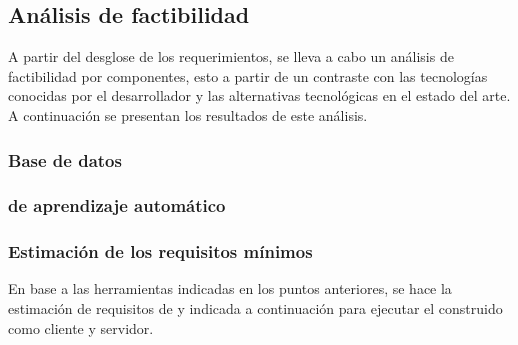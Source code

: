 \subsection{Análisis de factibilidad}
A partir del desglose de los requerimientos, se lleva a cabo un análisis de factibilidad por componentes, esto a partir de un contraste con las tecnologías conocidas por el desarrollador y las alternativas tecnológicas en el estado del arte. A continuación se presentan los resultados de este análisis.

\subsubsection*{}


\subsubsection*{}


\subsubsection*{Base de datos}

\subsubsection*{ de aprendizaje automático}


\subsubsection*{Estimación de los requisitos mínimos}
En base a las herramientas indicadas en los puntos anteriores, se hace la estimación de requisitos de  y  indicada a continuación para ejecutar el  construido como cliente y servidor.